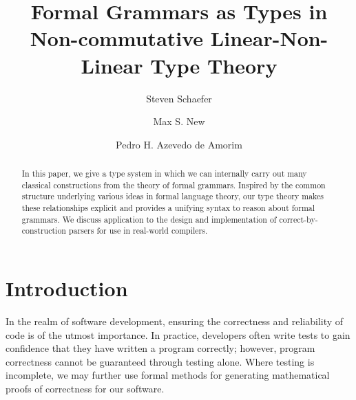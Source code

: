 \documentclass[acmsmall,screen,nonacm]{acmart}
\newif\ifdraft
\begin{document}
\pagestyle{plain}



\pagebreak

\ifdraft{
\listoftodos{list of todos}
\pagebreak}\fi

\title{Formal Grammars as Types in Non-commutative Linear-Non-Linear Type Theory}

\author{Steven Schaefer}

\author{Max S. New}

\author{Pedro H. Azevedo de Amorim}

\makeatletter
\let\@authorsaddresses\@empty
\makeatother

\begin{abstract}
  In this paper, we give a type system in which we can
  internally carry out many classical constructions from
  the theory of formal grammars. Inspired by the common
  structure underlying various ideas in formal language
  theory, our type theory makes these relationships explicit
  and provides a unifying syntax to reason about formal
  grammars. We discuss application to the design and
  implementation of correct-by-construction parsers for use
  in real-world compilers.
\end{abstract}

\maketitle

\setcounter{page}{1}

\section{Introduction}
In the realm of software development, ensuring the correctness and reliability
of code is of the utmost importance. In practice, developers often write tests
to gain confidence that they have written a program correctly; however,
program correctness cannot be guaranteed through testing alone. Where testing is
incomplete, we may further use formal methods for generating mathematical proofs of
correctness for our software.
\end{document}
